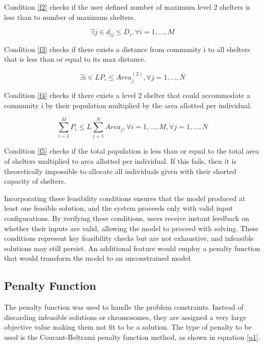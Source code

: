 	Condition \ref{f2} checks if the user defined number of maximum level 2 shelters is less than to number of maximum shelters.
	
	\begin{equation} 
		\label{f3}
		\exists j \in d_{ij} \le D_{i}, \forall i = 1, ..., M
	\end{equation}
	
	Condition \ref{f3} checks if there exists a distance from community i to all shelters that is less than or equal to its max distance.
	
	\begin{equation} 
		\label{f4}
		\exists i \in LP_{i} \le Area_{j}^{(2)}, \forall j = 1, ..., N
	\end{equation}
	
	Condition \ref{f4} checks if there exists a level 2 shelter that could accommodate a community i by their population multiplied by the area allotted per individual. 
	
	\begin{equation} 
		\label{f5}
		\sum_{i=1}^{M}P_{i} \le L\sum_{j=1}^{N}Area_{j}, \forall i=1,...,M,  \forall j=1,...,N
	\end{equation}
	
	Condition \ref{f5} checks if the total population is less than or equal to the total area of shelters multiplied to area allotted per individual. If this fails, then it is theoretically impossible to allocate all individuals given with their shorted capacity of shelters.
	
	Incorporating these feasibility conditions ensures that the model produced at least one feasible solution, and the system proceeds only with valid input configurations. By verifying these conditions, users receive instant feedback on whether their inputs are valid, allowing the model to proceed with solving. These conditions represent key feasibility checks but are not exhaustive, and infeasible solutions may still persist. An additional feature would employ a penalty function that would transform the model to an unconstrained model.	
	
\subsection{Penalty Function}
	The penalty function was used to handle the problem constraints. Instead of discarding infeasible solutions or chromosomes, they are assigned a very large objective value making them not fit to be a solution. The type of penalty to be used is the Courant-Beltrami penalty function method, as shown in equation \ref{p1}.
	

